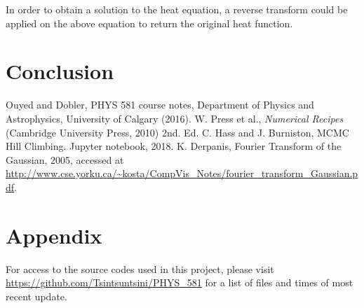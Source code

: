 \documentclass[twocolumn]{article}
\begin{document}
In order to obtain a solution to the heat equation, a reverse transform could be applied on the above equation to return the original heat function.

\section{Conclusion}



\begin{thebibliography}{00}
	Ouyed and Dobler, PHYS 581 course notes, Department of Physics and Astrophysics, University of Calgary (2016).
	W. Press et al., \emph{Numerical Recipes} (Cambridge University Press, 2010) 2nd. Ed.
	C. Hass and J. Burniston, MCMC Hill Climbing. Jupyter notebook, 2018.
	K. Derpanis, Fourier Transform of the Gaussian, 2005, accessed at \url{http://www.cse.yorku.ca/~kosta/CompVis_Notes/fourier_transform_Gaussian.pdf}.
\end{thebibliography}

\section{Appendix}
For access to the source codes used in this project, please visit \url{https://github.com/Tsintsuntsini/PHYS_581} for a list of files and times of most recent update.
	
\end{document}
